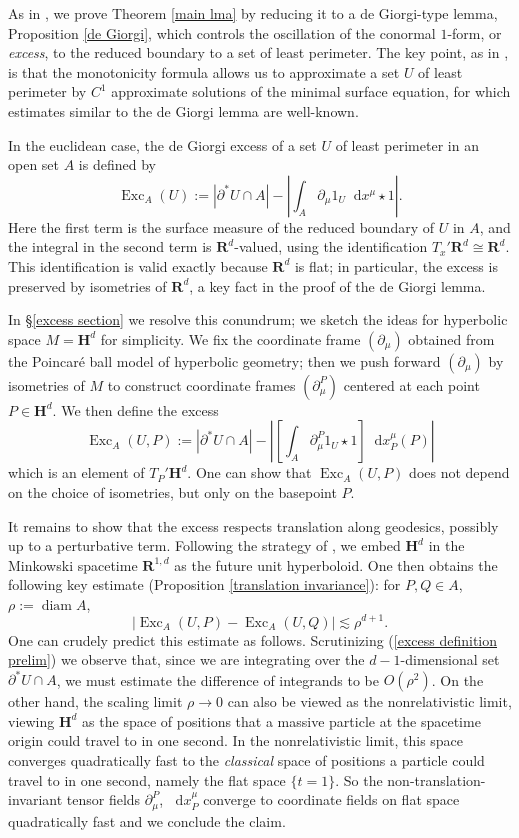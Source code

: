 \documentclass[reqno,11pt]{amsart}
\newcommand{\RR}{\mathbf{R}}
\newcommand{\Hyp}{\mathbf H}
\DeclareMathOperator{\diam}{diam}
\DeclareMathOperator{\Exc}{Exc}
\newcommand*\dif{\mathop{}\!\mathrm{d}}
\newcommand{\dfn}[1]{\emph{#1}\index{#1}}
\theoremstyle{definition}
\numberwithin{equation}{section}
\begin{document}
As in \cite{Miranda66, Giusti77}, we prove Theorem \ref{main lma} by reducing it to a de Giorgi-type lemma, Proposition \ref{de Giorgi}, which controls the oscillation of the conormal $1$-form, or \dfn{excess}, to the reduced boundary to a set of least perimeter.
The key point, as in \cite{Miranda66, Giusti77}, is that the monotonicity formula allows us to approximate a set $U$ of least perimeter by $C^1$ approximate solutions of the minimal surface equation, for which estimates similar to the de Giorgi lemma are well-known.

In the euclidean case, the de Giorgi excess of a set $U$ of least perimeter in an open set $A$ is defined by
$$\Exc_A(U) := |\partial^* U \cap A| - \left|\int_A \partial_\mu 1_U \dif x^\mu \star 1\right|.$$
Here the first term is the surface measure of the reduced boundary of $U$ in $A$, and the integral in the second term is $\RR^d$-valued, using the identification $T_x'\RR^d \cong \RR^d$.
This identification is valid exactly because $\RR^d$ is flat; in particular, the excess is preserved by isometries of $\RR^d$, a key fact in the proof of the de Giorgi lemma.

In \S\ref{excess section} we resolve this conundrum; we sketch the ideas for hyperbolic space $M = \Hyp^d$ for simplicity.
We fix the coordinate frame $(\partial_\mu)$ obtained from the Poincar\'e ball model of hyperbolic geometry; then we push forward $(\partial_\mu)$ by isometries of $M$ to construct coordinate frames $(\partial_\mu^P)$ centered at each point $P \in \Hyp^d$.
We then define the excess
\begin{equation}\label{excess definition prelim}
\Exc_A(U, P) := |\partial^* U \cap A| - \left|\left[\int_A \partial_\mu^P 1_U \star 1\right] \dif x^\mu_P(P)\right|
\end{equation}
which is an element of $T_P' \Hyp^d$.
One can show that $\Exc_A(U, P)$ does not depend on the choice of isometries, but only on the basepoint $P$.

It remains to show that the excess respects translation along geodesics, possibly up to a perturbative term.
Following the strategy of \cite{daskalopoulosPrep1}, we embed $\Hyp^d$ in the Minkowski spacetime $\RR^{1, d}$ as the future unit hyperboloid.
One then obtains the following key estimate (Proposition \ref{translation invariance}): for $P, Q \in A$, $\rho := \diam A$,
$$|\Exc_A(U, P) - \Exc_A(U, Q)| \lesssim \rho^{d + 1}.$$
One can crudely predict this estimate as follows.
Scrutinizing (\ref{excess definition prelim}) we observe that, since we are integrating over the $d-1$-dimensional set $\partial^* U \cap A$, we must estimate the difference of integrands to be $O(\rho^2)$.
On the other hand, the scaling limit $\rho \to 0$ can also be viewed as the nonrelativistic limit, viewing $\Hyp^d$ as the space of positions that a massive particle at the spacetime origin could travel to in one second.
In the nonrelativistic limit, this space converges quadratically fast to the \emph{classical} space of positions a particle could travel to in one second, namely the flat space $\{t = 1\}$.
So the non-translation-invariant tensor fields $\partial_\mu^P$, $\dif x^\mu_P$ converge to coordinate fields on flat space quadratically fast and we conclude the claim.
\end{document}
